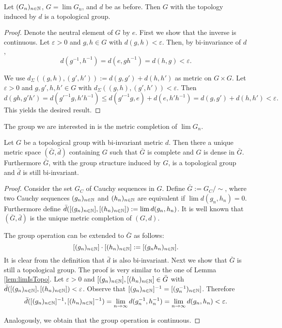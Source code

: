 \begin{lemma}\label{lem:limIsTopo}
	Let $(G_n)_{n\in\mathbb{N}}$, $G=\lim G_n$, and $d$ be as before. Then $G$ with the topology induced by $d$ is a topological group.
\end{lemma}
\begin{proof}
	Denote the neutral element of $G$ by $e$. First we show that the inverse is continuous. Let $\varepsilon>0$ and $g,h\in G$ with $d(g,h)<\varepsilon$. Then, by bi-invariance of $d$,
	\[d(g^{-1},h^{-1})=d(e,gh^{-1})=d(h,g)<\varepsilon.\]
				
	We use $d_\Sigma((g,h),(g',h')):=d(g,g')+d(h,h')$ as metric on $G\times G$. Let $\varepsilon>0$ and $g,g',h,h'\in G$ with $d_\Sigma((g,h),(g',h'))<\varepsilon$. Then
	\[d(gh,g'h')=d(g'^{-1}g,h'h^{-1})\leq d(g'^{-1}g,e)+d(e,h'h^{-1})=d(g,g')+d(h,h')<\varepsilon.\]
	This yields the desired result.
\end{proof}
		
		
The group we are interested in is the metric completion of $\lim G_n$. 
\begin{lemma}\label{lem:climIsTopo}
	Let $G$ be a topological group with bi-invariant metric $d$. Then there a unique metric space $(\bar G,\bar d)$ containing $G$ such that $\bar G$ is complete and $G$ is dense in $\bar G$. Furthermore $\bar G$, with the group structure induced by $G$, is a topological group and $\bar d$ is still bi-invariant.
\end{lemma}
\begin{proof}
	Consider the set $G_C$ of Cauchy sequences in $G$. Define $\bar G:=G_C/\sim$, where two Cauchy sequences $(g_n)_{n\in\mathbb{N}}$ and $(h_n)_{n\in\mathbb{N}}$ are equivalent if $\lim d(g_n,h_n)=0$. Furthermore define $\bar d([(g_n)_{n\in\mathbb{N}}],[(h_n)_{n\in\mathbb{N}}]):=\lim d(g_n,h_n)$. It is well known that $(\bar G,\bar d)$ is the unique metric completion of $(G,d)$.
				
	The group operation can be extended to $\bar G$ as follows:
	\[[(g_n)_{n\in\mathbb{N}}]\cdot[(h_n)_{n\in\mathbb{N}}]:=[(g_nh_n)_{n\in\mathbb{N}}].\]
	It is clear from the definition that $\bar d$ is also bi-invariant. Next we show that $\bar G$ is still a topological group. 
	The proof is very similar to the one of Lemma \ref{lem:limIsTopo}.
	Let $\varepsilon>0$ and $[(g_n)_{n\in\mathbb{N}}],[(h_n)_{n\in\mathbb{N}}]\in\bar G$ with $\bar d([(g_n)_{n\in\mathbb{N}}],[(h_n)_{n\in\mathbb{N}}])<\varepsilon$. Observe that $[(g_n)_{n\in\mathbb{N}}]^{-1}=[(g_n^{-1})_{n\in\mathbb{N}}]$. Therefore
	\[\bar d([(g_n)_{n\in\mathbb{N}}]^{-1},[(h_n)_{n\in\mathbb{N}}]^{-1})=\lim_{n\to\infty} d(g_n^{-1},h_n^{-1})=\lim_{n\to\infty} d(g_n,h_n)<\varepsilon. \]
				
	Analogously, we obtain that the group operation is continuous.
\end{proof}
		

